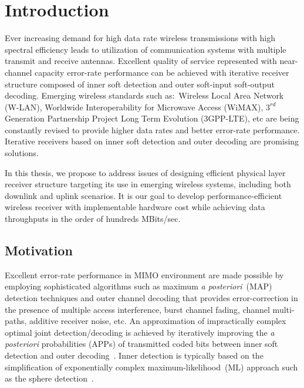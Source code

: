 \chapter{Introduction}
\label{ch:Intro}
Ever increasing demand for high data rate wireless transmissions with high spectral efficiency leads to utilization of communication systems with multiple transmit and receive antennas. Excellent quality of service represented with near-channel capacity error-rate performance can be achieved with iterative receiver structure composed of inner soft detection and outer soft-input soft-output decoding. Emerging wireless standards such as:~Wireless Local Area Network (W-LAN), Worldwide Interoperability for Microwave Access (WiMAX), $3^{rd}$ Generation Partnership Project Long Term Evolution (3GPP-LTE), etc are being constantly revised to provide higher data rates and better error-rate performance. Iterative receivers based on inner soft detection and outer decoding are promising solutions.

In this thesis, we propose to address issues of designing efficient physical layer receiver structure targeting its use in emerging wireless systems, including both downlink and uplink scenarios. It is our goal to develop performance-efficient wireless receiver with implementable hardware cost while achieving data throughputs in the order of hundreds MBits/sec. 

\section{Motivation}
\label{sec:Motivation}
Excellent error-rate performance in MIMO environment are made possible by employing sophisticated algorithms such as maximum \emph{a posteriori}~(MAP) detection techniques and outer channel decoding that provides error-correction in the presence of multiple access interference, burst channel fading, channel multi-paths, additive receiver noise, etc. An approximation of impractically complex optimal joint detection/decoding is achieved by iteratively improving the \emph{a posteriori} probabilities (APPs) of transmitted coded bits between inner soft detection and outer decoding~\cite{HochwaldTC03}. Inner detection is typically based on the simplification of exponentially complex maximum-likelihood~(ML) approach such as the sphere detection~\cite{FinckeMC85}. 